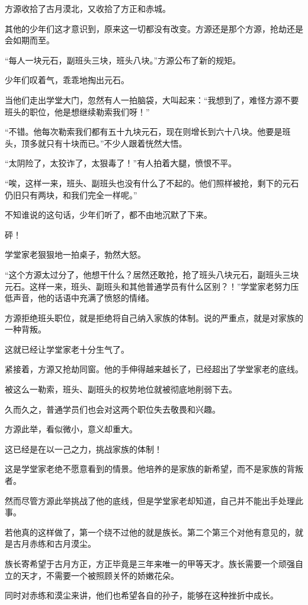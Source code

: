 \begin{this_body}
方源收拾了古月漠北，又收拾了方正和赤城。

其他的少年们这才意识到，原来这一切都没有改变。方源还是那个方源，抢劫还是会如期而至。

“每人一块元石，副班头三块，班头八块。”方源公布了新的规矩。

少年们叹着气，乖乖地掏出元石。

当他们走出学堂大门，忽然有人一拍脑袋，大叫起来：“我想到了，难怪方源不要班头的职位，他是想继续勒索我们呀！”

“不错。他每次勒索我们都有五十九块元石，现在则增长到六十八块。他要是班头，顶多就只有十块而已。”不少人跟着恍然大悟。

“太阴险了，太狡诈了，太狠毒了！”有人拍着大腿，愤恨不平。

“唉，这样一来，班头、副班头也没有什么了不起的。他们照样被抢，剩下的元石仍旧只有两块，和我们完全一样呢。”

不知谁说的这句话，少年们听了，都不由地沉默了下来。

砰！

学堂家老狠狠地一拍桌子，勃然大怒。

“这个方源太过分了，他想干什么？居然还敢抢，抢了班头八块元石，副班头三块元石。这样一来，班头、副班头和其他普通学员有什么区别？！”学堂家老努力压低声音，他的话语中充满了愤怒的情绪。

方源拒绝班头职位，就是拒绝将自己纳入家族的体制。说的严重点，就是对家族的一种背叛。

这就已经让学堂家老十分生气了。

紧接着，方源又抢劫同窗。他的手伸得越来越长了，已经超出了学堂家老的底线。

被这么一勒索，班头、副班头的权势地位就被彻底地削弱下去。

久而久之，普通学员们也会对这两个职位失去敬畏和兴趣。

方源此举，看似微小，意义却重大。

这已经是在以一己之力，挑战家族的体制！

这是学堂家老绝不愿意看到的情景。他培养的是家族的新希望，而不是家族的背叛者。

然而尽管方源此举挑战了他的底线，但是学堂家老却知道，自己并不能出手处理此事。

若他真的这样做了，第一个绕不过他的就是族长。第二个第三个对他有意见的，就是古月赤练和古月漠尘。

族长寄希望于古月方正，方正毕竟是三年来唯一的甲等天才。族长需要一个顽强自立的天才，不需要一个被照顾关怀的娇嫩花朵。

同时对赤练和漠尘来讲，他们也希望各自的孙子，能够在这种挫折中成长。


\end{this_body}
